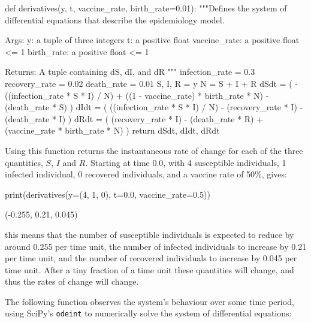 \begin{pyin}
def derivatives(y, t, vaccine_rate, birth_rate=0.01):
    """Defines the system of differential equations that
    describe the epidemiology model.

    Args:
        y: a tuple of three integers
        t: a positive float
        vaccine_rate: a positive float <= 1
        birth_rate: a positive float <= 1

    Returns:
        A tuple containing dS, dI, and dR
    """
    infection_rate = 0.3
    recovery_rate = 0.02
    death_rate = 0.01
    S, I, R = y
    N = S + I + R
    dSdt = (
        -((infection_rate * S * I) / N)
        + ((1 - vaccine_rate) * birth_rate * N)
        - (death_rate * S)
    )
    dIdt = (
        ((infection_rate * S * I) / N)
        - (recovery_rate * I)
        - (death_rate * I)
    )
    dRdt = (
        (recovery_rate * I)
        - (death_rate * R)
        + (vaccine_rate * birth_rate * N)
    )
    return dSdt, dIdt, dRdt
\end{pyin}

Using this function returns the instantaneous rate of change for each of the
three quantities, $S$, $I$ and $R$. Starting at time 0.0, with 4 susceptible
individuals, 1 infected individual, 0 recovered individuals, and a vaccine rate
of 50\%, gives:

\begin{pyin}
print(derivatives(y=(4, 1, 0), t=0.0, vaccine_rate=0.5))
\end{pyin}

\begin{pyout}
(-0.255, 0.21, 0.045)
\end{pyout}

this means that the number of susceptible individuals is expected to reduce by
around 0.255 per time unit, the number of infected individuals to increase by
0.21 per time unit, and the number of recovered individuals to increase by 0.045
per time unit. After a tiny fraction of a time unit these quantities will
change, and thus the rates of change will change.

The following function observes the system's behaviour over some time period,
using SciPy's \texttt{odeint} to numerically solve the system of
differential equations:

